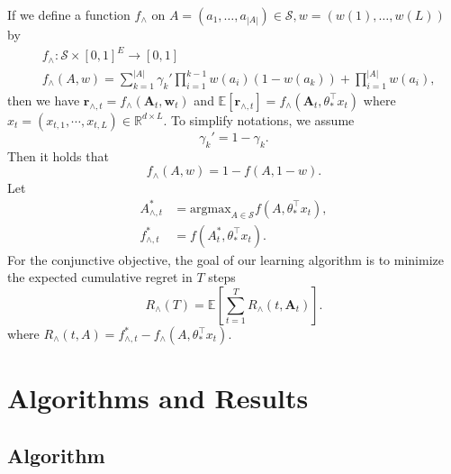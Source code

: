 \documentclass{article}
\newcommand{\EE}{\mathbb{E}}
\newcommand{\RR}{\mathbb{R}}
\newcommand{\bA}{\mathbf{A}}
\newcommand{\br}{\mathbf{r}}
\newcommand{\bw}{\mathbf{w}}
\newcommand{\cS}{\mathcal{S}}
\newcommand{\argmax}{\mathrm{argmax}}
\newcommand{\abs}[1]{\left| #1 \right|}
\begin{document}
If we define a function $f_{\wedge}$ on $A = (a_1, \ldots, a_{\abs{A}}) \in \cS, w = (w(1), \ldots, w(L))$ by
\begin{align}
&f_{\wedge} : \cS \times [0,1]^E \to [0,1] \nonumber \\
&f_{\wedge}(A,w) = \sum_{k = 1}^{\abs{A}} \gamma_k' \prod_{i = 1}^{k - 1} w(a_i)
 (1 - w(a_k)) + \prod_{i=1}^{\abs{A}}w(a_i),
 \label{eq:functionfstar}
\end{align}
then we have $\br_{\wedge, t} = f_{\wedge}(\bA_t, \bw_t)$ and $\EE[\br_{\wedge, t}] = f_{\wedge}(\bA_t, \theta_{\ast}^{\top}x_t)$ where $x_t = (x_{t,1}, \cdots, x_{t,L}) \in \RR^{d \times L}$. To simplify notations, we assume 
$$
\gamma_k' = 1 - \gamma_k.
$$
Then it holds that
\begin{equation}
\label{eq:ConDisRelation}
f_{\wedge}(A, w) = 1 - f(A, 1 - w).
\end{equation}
Let 
\begin{align*}
A_{\wedge, t}^{\ast} &= \argmax_{A\in \cS} f(A,\theta_{\ast}^{\top}x_t),\\
f_{\wedge, t}^{\ast} &= f(A_t^{\ast}, \theta_{\ast}^{\top}x_t).
\end{align*}
For the conjunctive objective, the goal of our learning algorithm is to minimize the expected cumulative regret in $T$ steps
$$
R_{\wedge}(T) = \EE\left[\sum_{t=1}^T R_{\wedge}(t, \bA_t)\right].
$$
where $R_{\wedge}(t, A) = f_{\wedge, t}^{\ast} - f_{\wedge}(A, \theta_{\ast}^{\top}x_t)$.



\section{Algorithms and Results}

\subsection{Algorithm}
	
\end{document}
